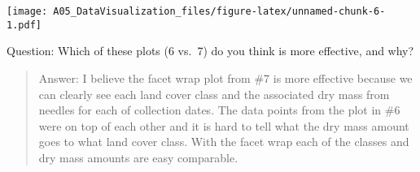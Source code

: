 \documentclass[]{article}
\newenvironment{Shaded}{\begin{snugshade}}{\end{snugshade}}
\newcommand{\DataTypeTok}[1]{\textcolor[rgb]{0.13,0.29,0.53}{#1}}
\newcommand{\DecValTok}[1]{\textcolor[rgb]{0.00,0.00,0.81}{#1}}
\newcommand{\KeywordTok}[1]{\textcolor[rgb]{0.13,0.29,0.53}{\textbf{#1}}}
\newcommand{\NormalTok}[1]{#1}
\newcommand{\OperatorTok}[1]{\textcolor[rgb]{0.81,0.36,0.00}{\textbf{#1}}}
\newcommand{\StringTok}[1]{\textcolor[rgb]{0.31,0.60,0.02}{#1}}
\begin{document}
\begin{Shaded}
\end{Shaded}

\texttt{[image: A05\_DataVisualization\_files/figure-latex/unnamed-chunk-6-1.pdf]}

Question: Which of these plots (6 vs.~7) do you think is more effective,
and why?

\begin{quote}
Answer: I believe the facet wrap plot from \#7 is more effective because
we can clearly see each land cover class and the associated dry mass
from needles for each of collection dates. The data points from the plot
in \#6 were on top of each other and it is hard to tell what the dry
mass amount goes to what land cover class. With the facet wrap each of
the classes and dry mass amounts are easy comparable.
\end{quote}
\end{document}

